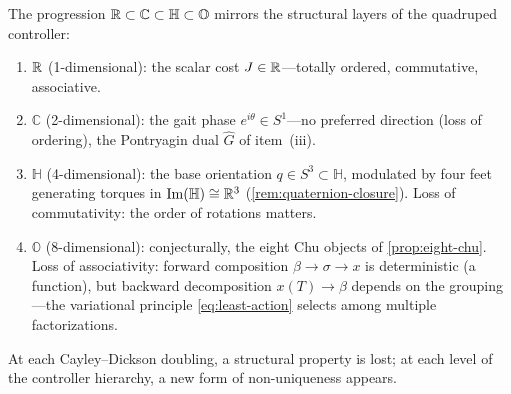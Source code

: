 \begin{remark}
\label{rmk:cayley-dickson}
The progression
$\mathbb{R} \subset \mathbb{C} \subset \mathbb{H} \subset \mathbb{O}$
mirrors the structural layers of the quadruped controller:
\begin{enumerate}[nosep]
\item $\mathbb{R}$ (1-dimensional): the scalar cost $J \in \mathbb{R}$---totally
  ordered, commutative, associative.
\item $\mathbb{C}$ (2-dimensional): the gait phase
  $e^{i\theta} \in S^1$---no preferred direction (loss of ordering),
  the Pontryagin dual $\widehat{G}$ of item~(iii).
\item $\mathbb{H}$ (4-dimensional): the base orientation
  $q \in S^3 \subset \mathbb{H}$, modulated by four feet generating
  torques in $\mathrm{Im}(\mathbb{H}) \cong \mathbb{R}^3$
  (\cref{rem:quaternion-closure}).
  Loss of commutativity: the order of rotations matters.
\item $\mathbb{O}$ (8-dimensional): conjecturally, the eight Chu
  objects of \cref{prop:eight-chu}.
  Loss of associativity: forward composition
  $\beta \to \sigma \to x$ is deterministic (a function),
  but backward decomposition $x(T) \to \beta$ depends on the
  grouping---the variational principle
  \eqref{eq:least-action} selects among multiple factorizations.
\end{enumerate}
At each Cayley--Dickson doubling, a structural property is lost;
at each level of the controller hierarchy, a new form of
non-uniqueness appears.


\end{remark}
